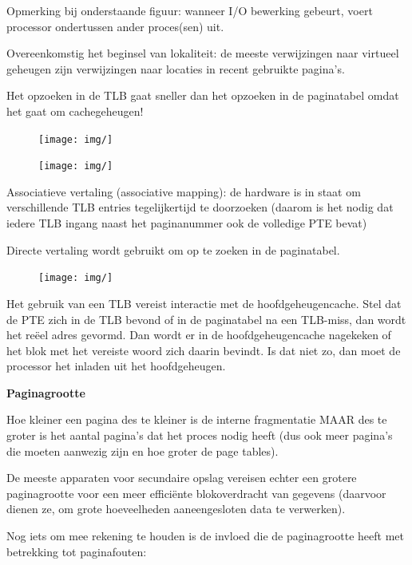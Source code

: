 Opmerking bij onderstaande figuur: wanneer I/O bewerking gebeurt, voert processor ondertussen ander proces(sen) uit.

Overeenkomstig het beginsel van lokaliteit: de meeste verwijzingen naar virtueel geheugen zijn verwijzingen naar locaties in recent gebruikte pagina's.

Het opzoeken in de TLB gaat sneller dan het opzoeken in de paginatabel omdat het gaat om cachegeheugen!

\begin{figure}[htp]
    \centering
            \texttt{[image: img/]}
        \caption{}
    \label{fig:}
\end{figure}


\begin{figure}[htp]
    \centering
            \texttt{[image: img/]}
        \caption{}
    \label{fig:}
\end{figure}

Associatieve vertaling (associative mapping): de hardware is in staat om verschillende TLB entries tegelijkertijd te doorzoeken (daarom is het nodig dat iedere TLB ingang naast het paginanummer ook de volledige PTE bevat)

Directe vertaling wordt gebruikt om op te zoeken in de paginatabel.

\begin{figure}[htp]
    \centering
            \texttt{[image: img/]}
        \caption{}
    \label{fig:}
\end{figure}

Het gebruik van een TLB vereist interactie met de hoofdgeheugencache. Stel dat de PTE zich in de TLB bevond of in de paginatabel na een TLB-miss, dan wordt het reëel adres gevormd. Dan wordt er in de hoofdgeheugencache nagekeken of het blok met het vereiste woord zich daarin bevindt. Is dat niet zo, dan moet de processor het inladen uit het hoofdgeheugen.

\textbf{Paginagrootte}

Hoe kleiner een pagina des te kleiner is de interne fragmentatie MAAR des te groter is het aantal pagina's dat het proces nodig heeft (dus ook meer pagina's die moeten aanwezig zijn en hoe groter de page tables).

De meeste apparaten voor secundaire opslag vereisen echter een grotere paginagrootte voor een meer efficiënte blokoverdracht van gegevens (daarvoor dienen ze, om grote hoeveelheden aaneengesloten data te verwerken).

Nog iets om mee rekening te houden is de invloed die de paginagrootte heeft met betrekking tot paginafouten:

